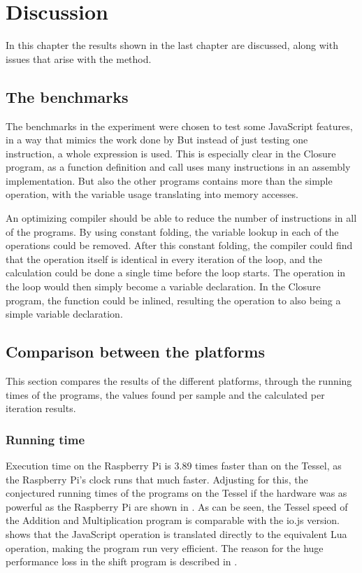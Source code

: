 \chapter{Discussion}
\label{chap:chapter5}
In this chapter the results shown in the last chapter are discussed, along with issues that arise with the method.

\section{The benchmarks}
\label{sec:benchmarkdiscussion}
The benchmarks in the experiment were chosen to test some JavaScript features, in a way that mimics the work done by \citeauthor{tiwari94} But instead of just testing one instruction, a whole expression is used. 
This is especially clear in the Closure program, as a function definition and call uses many instructions in an assembly implementation.
But also the other programs contains more than the simple operation, with the variable usage translating into memory accesses.

An optimizing compiler should be able to reduce the number of instructions in all of the programs.
By using constant folding, the variable lookup in each of the operations could be removed.
After this constant folding, the compiler could find that the operation itself is identical in every iteration of the loop, and the calculation could be done a single time before the loop starts.
The operation in the loop would then simply become a variable declaration.
In the Closure program, the function could be inlined, resulting the operation to also being a simple variable declaration.

\section{Comparison between the platforms}
This section compares the results of the different platforms, through the running times of the programs, the values found per sample and the calculated per iteration results.

\subsection{Running time}
Execution time on the Raspberry Pi is 3.89 times faster than on the Tessel, as the Raspberry Pi's clock runs that much faster.
Adjusting  for this, the conjectured running times of the programs on the Tessel if the hardware was as powerful as the Raspberry Pi are shown in .
As can be seen, the Tessel speed of the Addition and Multiplication program is comparable with the io.js version.
 shows that the JavaScript operation is translated directly to the equivalent Lua operation, making the program run very efficient.
The reason for the huge performance loss in the shift program is described in .

